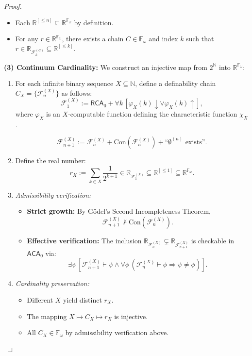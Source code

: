 \documentclass[12pt]{article}
\theoremstyle{definition}
\theoremstyle{plain}
\theoremstyle{remark}
\begin{document}
\begin{proof}
\begin{itemize}
\item[\(\subseteq\)] Each \( \mathbb{R}^{[\leq n]} \subseteq \mathbb{R}^{\mathbb{F}_\omega} \) by definition.

\item[\(\supseteq\)] For any \( r \in \mathbb{R}^{\mathbb{F}_\omega} \), there exists a chain \( C \in \mathbb{F}_\omega \) and index \( k \) such that \( r \in \mathbb{R}_{\mathcal{F}_k^{(C)}} \subseteq \mathbb{R}^{[\leq k]} \).
\end{itemize}

\textbf{(3) Continuum Cardinality:}  
We construct an injective map from \( 2^{\mathbb{N}} \) into \( \mathbb{R}^{\mathbb{F}_\omega} \):

\begin{enumerate}
\item For each infinite binary sequence \( X \subseteq \mathbb{N} \), define a definability chain \( C_X = \{ \mathcal{F}_n^{(X)} \} \) as follows:
\[
\mathcal{F}_1^{(X)} := \mathsf{RCA}_0 + \forall k\, [\varphi_X(k)\downarrow \lor \varphi_X(k)\uparrow],
\]
where \( \varphi_X \) is an \( X \)-computable function defining the characteristic function \( \chi_X \).

\[
\mathcal{F}_{n+1}^{(X)} := \mathcal{F}_n^{(X)} + \mathrm{Con}(\mathcal{F}_n^{(X)}) + \text{“$\emptyset^{(n)}$ exists”}.
\]

\item Define the real number:
\[
r_X := \sum_{k \in X} \frac{1}{2^{k+1}} \in \mathbb{R}_{\mathcal{F}_1^{(X)}} \subseteq \mathbb{R}^{[\leq 1]} \subseteq \mathbb{R}^{\mathbb{F}_\omega}.
\]

\item \emph{Admissibility verification:}
\begin{itemize}
    \item \textbf{Strict growth:} By Gödel's Second Incompleteness Theorem,
    \[
    \mathcal{F}_{n+1}^{(X)} \not\vdash \mathrm{Con}(\mathcal{F}_n^{(X)}).
    \]
    \item \textbf{Effective verification:} The inclusion \( \mathbb{R}_{\mathcal{F}_n^{(X)}} \subsetneq \mathbb{R}_{\mathcal{F}_{n+1}^{(X)}} \) is checkable in \( \mathsf{ACA}_0 \) via:
    \[
    \exists \psi\, [\mathcal{F}_{n+1}^{(X)} \vdash \psi \land \forall \phi\, (\mathcal{F}_n^{(X)} \vdash \phi \Rightarrow \psi \neq \phi)].
    \]
\end{itemize}

\item \emph{Cardinality preservation:}
\begin{itemize}
    \item Different \( X \) yield distinct \( r_X \).
    \item The mapping \( X \mapsto C_X \mapsto r_X \) is injective.
    \item All \( C_X \in \mathbb{F}_\omega \) by admissibility verification above.
\end{itemize}


\end{enumerate}
\end{proof}
\end{document}
